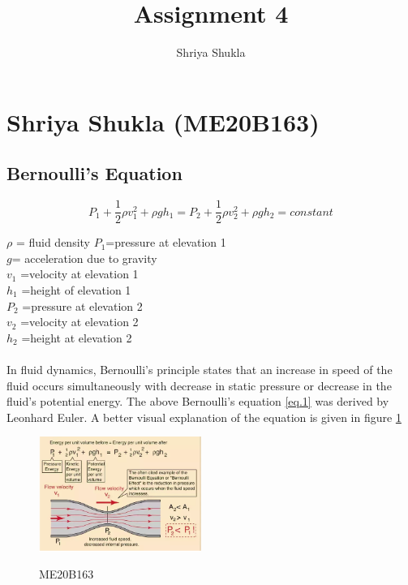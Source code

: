 \documentclass{article}
\title{Assignment 4}
\author{Shriya Shukla}
\begin{document}
\section{Shriya Shukla (ME20B163)}
\subsection{Bernoulli's Equation} \cite{bernoullieq}
\begin{equation}
P_{1}+\frac{1}{2}\rho v_{1}^{2}+\rho g h_{1}=P_{2}+\frac{1}{2}\rho v_{2}^{2}+\rho g h_{2}=constant \label{eq.1} 
\end{equation}

\begin{flushleft}
$\rho$ = fluid density \newline
$P_{1}$=pressure at elevation 1 \\
$g$= acceleration due to gravity \\
$v_{1}$	=velocity at elevation 1 \\
$h_{1}$	=height of elevation 1 \\
$P_{2}$	=pressure at elevation 2 \\
$v_{2}$	=velocity at elevation 2 \\
$h_{2}$	=height at elevation 2 \\

\end{flushleft}
\paragraph{}
In fluid dynamics, Bernoulli's principle states that an increase in speed of the fluid occurs simultaneously with decrease in static pressure or decrease in the fluid's potential energy. The above Bernoulli's equation \ref{eq.1} was derived by Leonhard Euler. A better visual explanation of the equation is given in figure \ref{fig:bernoulli}
\begin{figure}[h]
\begin{center}

\includegraphics[width=200px]{ME20B163.png} 
\caption{ME20B163}\cite{ME20B163}
\label{fig:bernoulli}		
		 
\end{center}
\end{figure}



\end{document}

